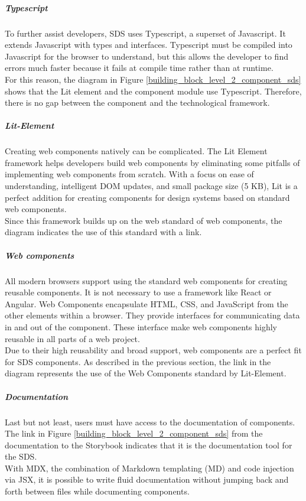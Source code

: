 \subparagraph{Typescript}
To further assist developers, \ac{SDS} uses Typescript, a superset of Javascript. It extends Javascript with types and interfaces. Typescript must be compiled into Javascript for the browser to understand, but this allows the developer to find errors much faster because it fails at compile time rather than at runtime. \citep{microsoft_typescript_nodate} \\
For this reason, the diagram in Figure \ref{building_block_level_2_component_sds} shows that the Lit element and the component module use Typescript. Therefore, there is no gap between the component and the technological framework. 

\subparagraph{Lit-Element}
Creating web components natively can be complicated. The Lit Element framework helps developers build web components by eliminating some pitfalls of implementing web components from scratch. With a focus on ease of understanding, intelligent \ac{DOM} updates, and small package size (5 KB), Lit is a perfect addition for creating components for design systems based on standard web components. \citep{lit_nodate} \\
Since this framework builds up on the web standard of web components, the diagram indicates the use of this standard with a link. 

\subparagraph{Web components}
All modern browsers support using the standard web components for creating reusable components. It is not necessary to use a framework like React or Angular. Web Components encapsulate \ac{HTML}, \ac{CSS}, and JavaScript from the other elements within a browser. They provide interfaces for communicating data in and out of the component. These interface make web components highly reusable in all parts of a web project. \citep{mdn_web_component_nodate} \\
Due to their high reusability and broad support, web components are a perfect fit for \ac{SDS} components. As described in the previous section, the link in the diagram represents the use of the Web Components standard by Lit-Element.

\subparagraph{Documentation}
Last but not least, users must have access to the documentation of components. The link in Figure \ref{building_block_level_2_component_sds} from the documentation to the Storybook indicates that it is the documentation tool for the \ac{SDS}. \\
With MDX, the combination of Markdown templating (MD) and code injection via JSX, it is possible to write fluid documentation without jumping back and forth between files while documenting components. \citep{otander_markdown_2017} \\

